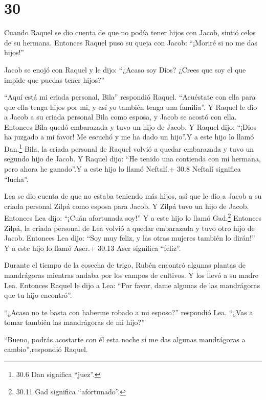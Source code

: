 \hypertarget{section-29}{%
\section{30}\label{section-29}}

 Cuando Raquel se dio cuenta de que no podía tener hijos con
Jacob, sintió celos de su hermana. Entonces Raquel puso su queja con
Jacob: ``¡Moriré si no me das hijos!''

 Jacob se enojó con Raquel y le dijo: ``¿Acaso soy Dios?
¿Crees que soy el que impide que puedas tener hijos?''

 ``Aquí está mi criada personal, Bila'' respondió Raquel.
``Acuéstate con ella para que ella tenga hijos por mi, y así yo también
tenga una familia''.  Y Raquel le dio a Jacob a su criada
personal Bila como esposa, y Jacob se acostó con ella. 
Entonces Bila quedó embarazada y tuvo un hijo de Jacob.  Y
Raquel dijo: ``¡Dios ha juzgado a mi favor! Me escuchó y me ha dado un
hijo''.Y a este hijo lo llamó Dan.\footnote{30.6 Dan significa ``juez''.}
 Bila, la criada personal de Raquel volvió a quedar
embarazada y tuvo un segundo hijo de Jacob.  Y Raquel dijo:
``He tenido una contienda con mi hermana, pero ahora he ganado''.Y a
este hijo lo llamó Neftalí.+ 30.8 Neftalí significa ``lucha''.

 Lea se dio cuenta de que no estaba teniendo más hijos, así
que le dio a Jacob a su criada personal Zilpá como esposa para Jacob.
 Y Zilpá tuvo un hijo de Jacob.  Entonces Lea
dijo: ``¡Cuán afortunada soy!'' Y a este hijo lo llamó Gad.\footnote{30.11
  Gad significa ``afortunado''.}  Entonces Zilpá, la criada
personal de Lea volvió a quedar embarazada y tuvo otro hijo de Jacob.
 Entonces Lea dijo: ``Soy muy feliz, y las otras mujeres
también lo dirán!'' Y a este hijo lo llamó Aser.+ 30.13 Aser significa
``feliz''.

 Durante el tiempo de la cosecha de trigo, Rubén encontró
algunas plantas de mandrágoras mientras andaba por los campos de
cultivos. Y los llevó a su madre Lea. Entonces Raquel le dijo a Lea:
``Por favor, dame algunas de las mandrágoras que tu hijo encontró''.

 ``¿Acaso no te basta con haberme robado a mi esposo?''
respondió Lea. ``¿Vas a tomar también las mandrágoras de mi hijo?''

``Bueno, podrás acostarte con él esta noche si me das algunas
mandrágoras a cambio'',respondió Raquel.

